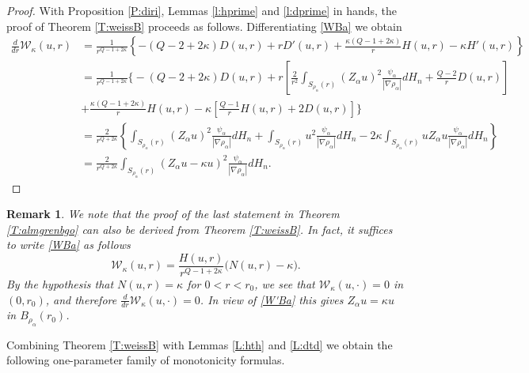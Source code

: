 \documentclass[11pt]{amsart}
\theoremstyle{plain}
\newtheorem{rmrk}[thrm]{Remark}
\numberwithin{equation}{section}
\begin{document}
\begin{proof}

With Proposition \ref{P:diri}, Lemmas \ref{l:hprime} and \ref{l:dprime} in hands, the proof of Theorem \ref{T:weissB} proceeds as follows.
Differentiating \eqref{WBa} we obtain
\begin{align*}
 \frac{d}{dr}\mathcal{W}_\kappa(u,r) & = \frac{1}{r^{Q-1+2\kappa}} \left\{-(Q-2+2\kappa) D(u,r) + r D'(u,r) + \frac{\kappa(Q-1+2\kappa)}{r} H(u,r) - \kappa H'(u,r)\right\}
\\
& = \frac{1}{r^{Q-1+2\kappa}} \bigg\{-(Q-2+2\kappa) D(u,r) + r \left[\frac{2}{r^2} \int_{S_{\rho_\alpha}(r)} (Z_\alpha u)^2 \frac{\psi_\alpha}{|\nabla {\rho_\alpha}|}dH_{n} + \frac{Q-2}{r} D(u,r)\right]
\\
& + \frac{\kappa(Q-1+2\kappa)}{r} H(u,r) - \kappa \left[\frac{Q-1}{r}H(u,r)+2D(u,r)\right]\bigg\}
\\
& = \frac{2}{r^{Q+2\kappa}}  \left\{\int_{S_{\rho_\alpha}(r)} (Z_\alpha u)^2 \frac{\psi_\alpha}{|\nabla {\rho_\alpha}|}dH_{n}  + \int_{S_{\rho_\alpha}(r)} u^2 \frac{\psi_\alpha}{|\nabla {\rho_\alpha}|}dH_{n} - 2\kappa \int_{S_{\rho_\alpha}(r)} u Z_\alpha u \frac{\psi_\alpha}{|\nabla {\rho_\alpha}|}dH_{n}\right\}
\\
& = \frac{2}{r^{Q+2\kappa}}\int_{{S_{\rho_\alpha}(r)}}(Z_\alpha u-\kappa u)^2\frac{\psi_\alpha}{|\nabla {\rho_\alpha}|}dH_{n}.
 \end{align*}

\end{proof}

\begin{rmrk}\label{R:sh}
We note that the proof of the last statement in Theorem \ref{T:almgrenbgo} can also be derived from Theorem \ref{T:weissB}. In fact, it suffices to  write \eqref{WBa} as follows
\begin{equation}\label{WkBa}
\mathcal W_\kappa(u,r) = \frac{H(u,r)}{r^{Q-1+2\kappa}} \big(N(u,r) - \kappa\big).
\end{equation}
By the hypothesis that $N(u,r) = \kappa$ for $0<r<r_0$, we see that $\mathcal W_\kappa(u,\cdot) =0$ in $(0,r_0)$, and therefore $\frac{d}{dr} \mathcal W_\kappa(u,\cdot) = 0$. In view of \eqref{W'Ba} this gives ${Z_\alpha} u = \kappa u$ in $B_{\rho_\alpha}(r_0)$.
\end{rmrk}

Combining Theorem \ref{T:weissB} with Lemmas \ref{L:hth} and \ref{L:dtd} we obtain the following one-parameter family of monotonicity formulas.
\end{document}
